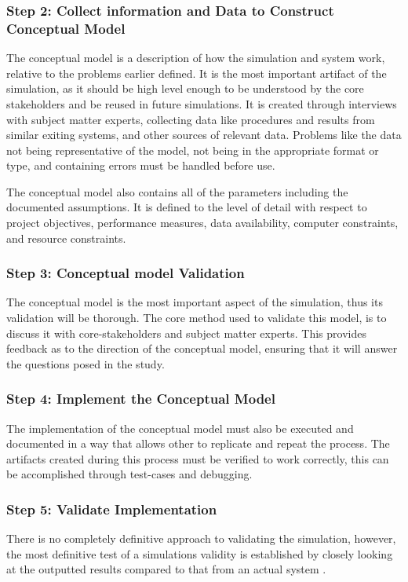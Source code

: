\subsubsection{Step 2: Collect information and Data to Construct Conceptual Model}
The conceptual model is a description of how the simulation and system work, relative to the problems earlier defined.
It is the most important artifact of the simulation, as it should be high level enough to be understood by the core stakeholders
and be reused in future simulations.
It is created through interviews with subject matter experts, collecting data like procedures and results from similar exiting systems, and other sources of relevant data.
Problems like the data not being representative of the model, not being in the appropriate format or type, and containing errors must be handled before use.

The conceptual model also contains all of the parameters including the documented assumptions. 
It is defined to the level of detail with respect to project objectives, performance measures, data availability, computer constraints, and resource constraints.

\subsubsection{Step 3: Conceptual model Validation}
The conceptual model is the most important aspect of the simulation, thus its validation will be thorough.
The core method used to validate this model, is to discuss it with core-stakeholders and subject matter experts.
This provides feedback as to the direction of the conceptual model, ensuring that it will answer the questions posed in the study.

\subsubsection{Step 4: Implement the Conceptual Model}
The implementation of the conceptual model must also be executed and documented in a way that allows other to replicate and repeat the process.
The artifacts created during this process must be verified to work correctly, this can be accomplished through test-cases and debugging.

\subsubsection{Step 5: Validate Implementation}
There is no completely definitive approach to validating the simulation,
however, the most definitive test of a simulations validity is established by closely looking at the outputted results compared to that from an actual system \cite{Law2005}.

